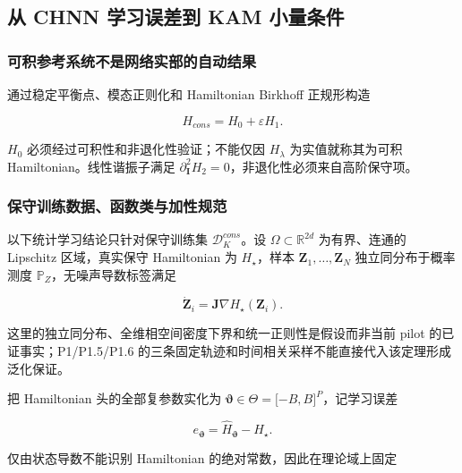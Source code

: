\subsection{从 CHNN 学习误差到 KAM 小量条件}\label{sec:chnn-4-6}

\subsubsection{可积参考系统不是网络实部的自动结果}\label{sec:chnn-4-6-1}

通过稳定平衡点、模态正则化和 Hamiltonian Birkhoff 正规形构造

\begin{equation}
\label{eq:chnn-4-35}
H_{cons} = H_{0} + \varepsilon H_{1}.
\end{equation}

\(H_{0}\) 必须经过可积性和非退化性验证；不能仅因 \(H_{\lambda}\) 为实值就称其为可积 Hamiltonian。线性谐振子满足 \(\partial_{\mathbf{I}}^{2}H_{2} = 0\)，非退化性必须来自高阶保守项。

\subsubsection{保守训练数据、函数类与加性规范}\label{sec:chnn-4-6-2}

以下统计学习结论只针对保守训练集 \(\mathcal{D}_{K}^{cons}\)。设 \(\Omega \subset \mathbb{R}^{2d}\) 为有界、连通的 Lipschitz 区域，真实保守 Hamiltonian 为 \(H_{\star}\)，样本 \(\mathbf{Z}_{1},\ldots,\mathbf{Z}_{N}\) 独立同分布于概率测度 \(\mathbb{P}_{Z}\)，无噪声导数标签满足

\begin{equation}
\label{eq:chnn-4-36}
{\dot{\mathbf{Z}}}_{i} = \mathbf{J}\nabla H_{\star}\left( \mathbf{Z}_{i} \right).
\end{equation}

这里的独立同分布、全维相空间密度下界和统一正则性是假设而非当前 pilot 的已证事实；P1/P1.5/P1.6 的三条固定轨迹和时间相关采样不能直接代入该定理形成泛化保证。

把 Hamiltonian 头的全部复参数实化为 \(\bm{\vartheta} \in \Theta = \lbrack - B,B\rbrack^{P}\)，记学习误差

\begin{equation}
\label{eq:chnn-4-37}
e_{\bm{\vartheta}} = {\widehat{H}}_{\bm{\vartheta}} - H_{\star}.
\end{equation}

仅由状态导数不能识别 Hamiltonian 的绝对常数，因此在理论域上固定

